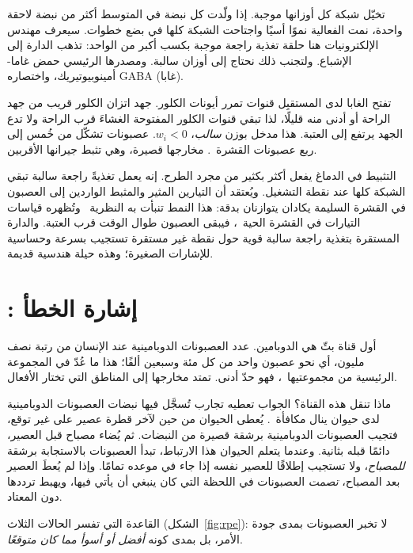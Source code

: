 تخيّل شبكة كل أوزانها موجبة. إذا ولّدت كل نبضة في المتوسط أكثر من نبضة لاحقة واحدة، نمت الفعالية نموًا أسيًا واجتاحت الشبكة كلها في بضع خطوات. سيعرف مهندس الإلكترونيات هنا حلقة تغذية راجعة موجبة بكسب أكبر من الواحد: تذهب الدارة إلى الإشباع. ولتجنب ذلك نحتاج إلى أوزان سالبة. ومصدرها الرئيسي حمض غاما-أمينوبيوتيريك، واختصاره \foreignlanguage{english}{GABA} (غابا).

تفتح الغابا لدى المستقبِل قنوات تمرر أيونات الكلور. جهد اتزان الكلور قريب من جهد الراحة أو أدنى منه قليلًا، لذا تبقي قنوات الكلور المفتوحة الغشاءَ قرب الراحة ولا تدع الجهد يرتفع إلى العتبة. هذا مدخل بوزن \emph{سالب}، $w_i<0$. عصبونات  تشكّل من خُمس إلى ربع عصبونات القشرة~\cite{Hendry1987}. مخارجها قصيرة، وهي تثبط جيرانها الأقربين.

التثبيط في الدماغ يفعل أكثر بكثير من مجرد الطرح. إنه يعمل تغذيةً راجعة سالبة تبقي الشبكة كلها عند نقطة التشغيل. ويُعتقد أن التيارين المثير والمثبط الواردين إلى العصبون في القشرة السليمة يكادان يتوازنان بدقة: هذا النمط تنبأت به النظرية~\cite{vanVreeswijk1996} وتُظهره قياسات التيارات في القشرة الحية~\cite{Haider2006}، فيبقى العصبون طوال الوقت قرب العتبة. والدارة المستقرة بتغذية راجعة سالبة قوية حول نقطة غير مستقرة تستجيب بسرعة وحساسية للإشارات الصغيرة؛ وهذه حيلة هندسية قديمة.

\section{: إشارة الخطأ}

أول قناة بثّ هي الدوبامين. عدد العصبونات الدوبامينية عند الإنسان من رتبة نصف مليون، أي نحو عصبون واحد من كل مئة وسبعين ألفًا؛ هذا ما عُدّ في المجموعة الرئيسية من مجموعتيها~\cite{Pakkenberg1991}، فهو حدّ أدنى. تمتد مخارجها إلى المناطق التي تختار الأفعال.

ماذا تنقل هذه القناة؟ الجواب تعطيه تجارب تُسجَّل فيها نبضات العصبونات الدوبامينية لدى حيوان ينال مكافأة~\cite{Schultz1997}. يُعطى الحيوان من حين لآخر قطرة عصير على غير توقع، فتجيب العصبونات الدوبامينية برشقة قصيرة من النبضات. ثم يُضاء مصباح قبل العصير، دائمًا قبله بثانية. وعندما يتعلم الحيوان هذا الارتباط، تبدأ العصبونات بالاستجابة برشقة \emph{للمصباح}، ولا تستجيب إطلاقًا للعصير نفسه إذا جاء في موعده تمامًا. وإذا لم يُعطَ العصير بعد المصباح، \emph{تصمت} العصبونات في اللحظة التي كان ينبغي أن يأتي فيها، ويهبط ترددها دون المعتاد.

القاعدة التي تفسر الحالات الثلاث (الشكل~\ref{fig:rpe}): لا تخبر العصبونات بمدى جودة الأمر، بل بمدى كونه \emph{أفضل أو أسوأ مما كان متوقعًا}.


